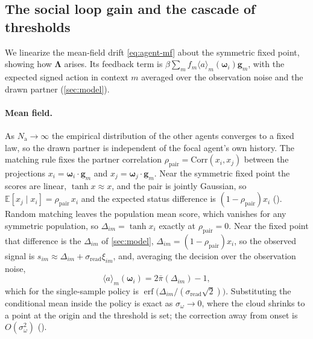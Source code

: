 \documentclass[
  aps,prx,
  reprint,
  superscriptaddress,
  nofootinbib,
  longbibliography
]{revtex4-2}
\newcommand{\w}{\bm{\omega}}
\newcommand{\g}{\mathbf{g}}
\newcommand{\Lam}{\bm{\Lambda}}
\newcommand{\rhopair}{\rho_{\mathrm{pair}}}
\newcommand{\sread}{\sigma_{\mathrm{read}}}
\newcommand{\sidn}{\sigma_{\omega}}
\newcommand{\pibar}{\bar\pi}
\newcommand{\Nag}{N_{\mathrm{a}}}
\newcommand{\smref}[1]{\cite[Sec.~#1]{SM}}
\begin{document}
\subsection{The social loop gain and the cascade of thresholds}\label{sec:gain}

\noindent We linearize the mean-field drift \cref{eq:agent-mf} about the symmetric fixed point, showing how $\Lam$ arises. Its feedback term is $\beta\sum_m f_m\langle a\rangle_m(\w_i)\g_m$, with the expected signed action in context $m$ averaged over the observation noise and the drawn partner (\cref{sec:model}).

\paragraph{Mean field.} As $\Nag\to\infty$ the empirical distribution of the other agents converges to a fixed law, so the drawn partner is independent of the focal agent's own history. The matching rule fixes the partner correlation $\rhopair=\mathrm{Corr}(x_i,x_j)$ between the projections $x_i=\w_i\cdot\g_m$ and $x_j=\w_j\cdot\g_m$. Near the symmetric fixed point the scores are linear, $\tanh x\approx x$, and the pair is jointly Gaussian, so $\mathbb E[x_j\mid x_i]=\rhopair\,x_i$ and the expected status difference is $(1-\rhopair)x_i$ (\smref{S2\,B}). Random matching leaves the population mean score, which vanishes for any symmetric population, so $\Delta_{im}=\tanh x_i$ exactly at $\rhopair=0$. Near the fixed point that difference is the $\Delta_{im}$ of \cref{sec:model}, $\Delta_{im}=(1-\rhopair)x_i$, so the observed signal is $s_{im}\approx\Delta_{im}+\sread\xi_{im}$, and, averaging the decision over the observation noise,
\begin{equation}\label{eq:abar}
\langle a\rangle_m(\w_i)=2\pibar(\Delta_{im})-1,
\end{equation}
which for the single-sample policy is $\operatorname{erf}\!\bigl(\Delta_{im}/(\sread\sqrt2)\bigr)$. Substituting the conditional mean inside the policy is exact as $\sidn\to0$, where the cloud shrinks to a point at the origin and the threshold is set; the correction away from onset is $O(\sidn^2)$ (\smref{S6}).
\end{document}
